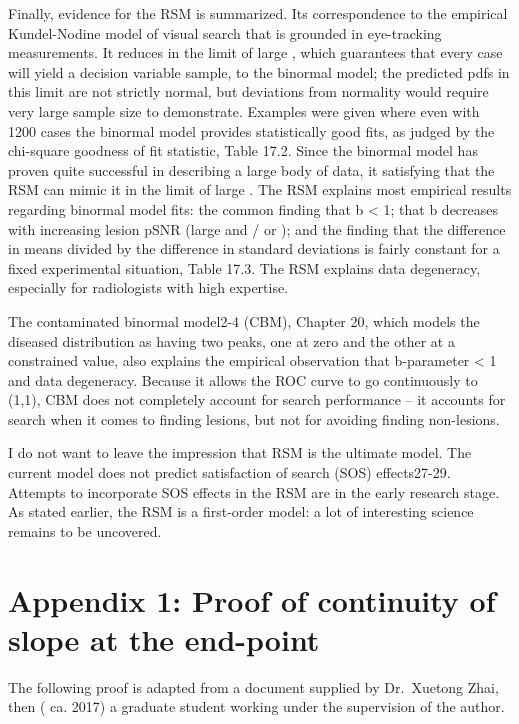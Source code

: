 \documentclass[
]{book}
\begin{document}
Finally, evidence for the RSM is summarized. Its correspondence to the empirical Kundel-Nodine model of visual search that is grounded in eye-tracking measurements. It reduces in the limit of large , which guarantees that every case will yield a decision variable sample, to the binormal model; the predicted pdfs in this limit are not strictly normal, but deviations from normality would require very large sample size to demonstrate. Examples were given where even with 1200 cases the binormal model provides statistically good fits, as judged by the chi-square goodness of fit statistic, Table 17.2. Since the binormal model has proven quite successful in describing a large body of data, it satisfying that the RSM can mimic it in the limit of large . The RSM explains most empirical results regarding binormal model fits: the common finding that b \textless{} 1; that b decreases with increasing lesion pSNR (large and / or ); and the finding that the difference in means divided by the difference in standard deviations is fairly constant for a fixed experimental situation, Table 17.3. The RSM explains data degeneracy, especially for radiologists with high expertise.

The contaminated binormal model2-4 (CBM), Chapter 20, which models the diseased distribution as having two peaks, one at zero and the other at a constrained value, also explains the empirical observation that b-parameter \textless{} 1 and data degeneracy. Because it allows the ROC curve to go continuously to (1,1), CBM does not completely account for search performance -- it accounts for search when it comes to finding lesions, but not for avoiding finding non-lesions.

I do not want to leave the impression that RSM is the ultimate model. The current model does not predict satisfaction of search (SOS) effects27-29. Attempts to incorporate SOS effects in the RSM are in the early research stage. As stated earlier, the RSM is a first-order model: a lot of interesting science remains to be uncovered.

\hypertarget{rsm-predictions-appendix1}{%
\section{Appendix 1: Proof of continuity of slope at the end-point}\label{rsm-predictions-appendix1}}

The following proof is adapted from a document supplied by Dr.~Xuetong Zhai, then ( ca. 2017) a graduate student working under the supervision of the author.
\end{document}
